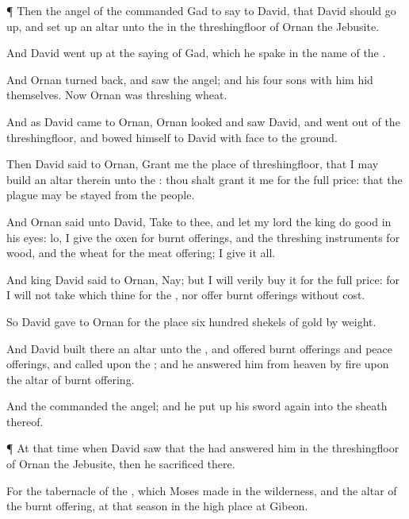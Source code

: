 {\par }{\PP {}¶ Then the
angel of the
{}
commanded
Gad to
say to
David, that
David should go
up, and set
up an
altar unto the
{} in the
threshingfloor of
Ornan the
Jebusite.

And
David went
up at the
saying of
Gad, which he
spake in the
name of the
{}.

And
Ornan turned
back, and
saw the
angel; and his
four
sons with him
hid themselves. Now
Ornan was
threshing
wheat.

And as
David
came to
Ornan,
Ornan
looked and
saw
David, and went
out of the
threshingfloor, and
bowed himself to
David with
{}
face to the
ground.

Then
David
said to
Ornan,
Grant me the
place of
{}
threshingfloor, that I may
build an
altar therein unto the
{}: thou shalt
grant it me for the
full
price: that the
plague may be
stayed from the
people.

And
Ornan
said unto
David,
Take
{} to thee, and let my
lord the
king
do
{}
good in his
eyes:
lo, I
give
{} the
oxen
{} for burnt
offerings, and the threshing
instruments for
wood, and the
wheat for the meat
offering; I
give it all.

And
king
David
said to
Ornan, Nay; but I will
verily
buy it for the
full
price: for I will not
take
{} which
{} thine for the
{}, nor
offer burnt
offerings without
cost.

So
David
gave to
Ornan for the
place
six
hundred
shekels of
gold by
weight.

And
David
built there an
altar unto the
{}, and
offered burnt
offerings and peace
offerings, and
called upon the
{}; and he
answered him from
heaven by
fire upon the
altar of burnt
offering.

And the
{}
commanded the
angel; and he put
up his
sword
again into the
sheath thereof.


\par }{\PP {}¶ At that
time when
David
saw that the
{} had
answered him in the
threshingfloor of
Ornan the
Jebusite, then he
sacrificed there.

For the
tabernacle of the
{}, which
Moses
made in the
wilderness, and the
altar of the burnt
offering,
{} at that
season in the high
place at
Gibeon.

}
